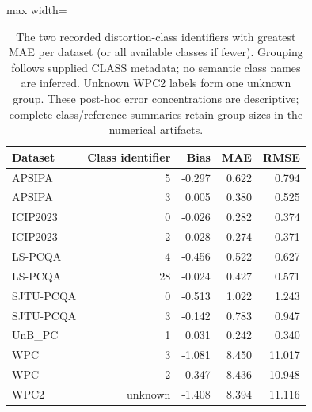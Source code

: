 \documentclass[final,3p,times,twocolumn]{elsarticle}
\begin{document}
\begin{table}[t!]
    \centering
    \caption{The two recorded distortion-class identifiers with greatest MAE per dataset (or all available classes if fewer). Grouping follows supplied CLASS metadata; no semantic class names are inferred. Unknown WPC2 labels form one unknown group. These post-hoc error concentrations are descriptive; complete class/reference summaries retain group sizes in the numerical artifacts.}
    \label{tab_review_error_groups}
    \scriptsize
    \begin{adjustbox}{max width=\columnwidth}
        \begin{tabular}{lrrrr}
        \toprule
        Dataset & Class identifier & Bias & MAE & RMSE \\
        \midrule
        APSIPA & 5 & -0.297 & 0.622 & 0.794 \\
        APSIPA & 3 & 0.005 & 0.380 & 0.525 \\
        ICIP2023 & 0 & -0.026 & 0.282 & 0.374 \\
        ICIP2023 & 2 & -0.028 & 0.274 & 0.371 \\
        LS-PCQA & 4 & -0.456 & 0.522 & 0.627 \\
        LS-PCQA & 28 & -0.024 & 0.427 & 0.571 \\
        SJTU-PCQA & 0 & -0.513 & 1.022 & 1.243 \\
        SJTU-PCQA & 3 & -0.142 & 0.783 & 0.947 \\
        UnB\_PC & 1 & 0.031 & 0.242 & 0.340 \\
        WPC & 3 & -1.081 & 8.450 & 11.017 \\
        WPC & 2 & -0.347 & 8.436 & 10.948 \\
        WPC2 & unknown & -1.408 & 8.394 & 11.116 \\
        \bottomrule
        \end{tabular}
    \end{adjustbox}
\end{table}



 

\end{document}
